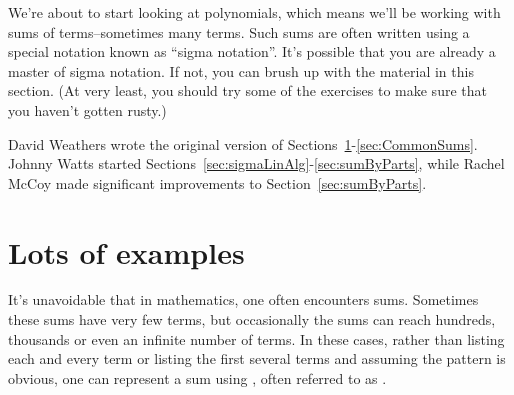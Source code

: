 


We're about to start looking at polynomials, which means we'll be working with sums of terms--sometimes many terms. Such sums are often written using a special notation known as ``sigma notation''.  It's possible that you are already a master of sigma notation. If not, you can brush up with the material in this section. (At very least, you should try some of the exercises to make sure that you haven't gotten rusty.)
\bigskip

David Weathers wrote the original version of Sections~\ref{sec:sigmaExamples}-\ref{sec:CommonSums}. Johnny Watts started Sections~\ref{sec:sigmaLinAlg}-\ref{sec:sumByParts}, while  Rachel McCoy made significant improvements to Section~\ref{sec:sumByParts}.

\section{Lots of examples}\label{sec:sigmaExamples}

It's unavoidable that in mathematics, one often encounters sums.  Sometimes these sums have very few terms, but occasionally the sums can reach hundreds, thousands or even an infinite number of terms.  In these cases, rather than listing each and every term or listing the first several terms and assuming the pattern is obvious, one can represent a sum using , often referred to as . 

